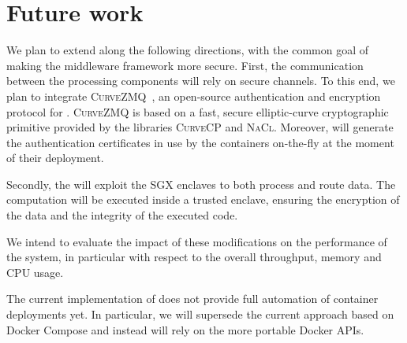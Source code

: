 \section{Future work}
\label{sec:future}
We plan to extend \SYS along the following directions, with the common goal of making the middleware framework more secure.
First, the communication between the processing components will rely on secure channels.
To this end, we plan to integrate \textsc{CurveZMQ}~\cite{zmq:curvezmq}, an open-source authentication and encryption protocol for \zmq.
\textsc{CurveZMQ} is based on a fast, secure elliptic-curve cryptographic primitive provided by the libraries \textsc{CurveCP}\cite{zmq:curvecp} and \textsc{NaCl}\cite{zmq:nacl}. 
Moreover, \SYS will generate the authentication certificates in use by the containers on-the-fly at the moment of their deployment.

Secondly, the \SYS will exploit the SGX enclaves to both process and route data.
The computation will be executed inside a trusted enclave, ensuring the encryption of the data and the integrity of the executed code.

We intend to evaluate the impact of these modifications on the performance of the system, in particular with respect to the overall throughput, memory and CPU usage.

The current implementation of \SYS does not provide full automation of container deployments yet.
In particular, we will supersede the current approach based on Docker Compose and instead will rely on the more portable Docker APIs.

